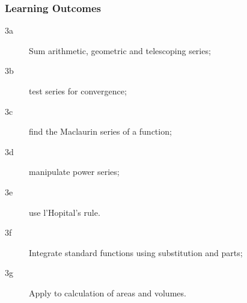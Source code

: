\documentclass{beamer}
\begin{document}
	\begin{frame}
		\frametitle{Learning Outcomes}
		\begin{description}
			\item[3a] Sum arithmetic, geometric and telescoping series; 
			\item[3b] test series for convergence; 
			\item[3c] find the Maclaurin series of a function; 
			\item[3d] manipulate power series; 
			\item[3e] use l'Hopital's rule. 
			\item[3f] Integrate standard functions using substitution and parts; 
			\item[3g] Apply to calculation of areas and volumes. 
		\end{description}
	\end{frame}
	
\end{document}
